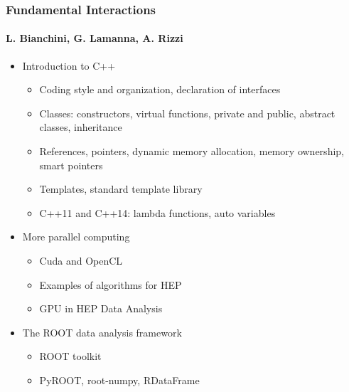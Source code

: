 \documentclass[9pt]{beamer}
\begin{document}
\begin{frame}
  \frametitle{Fundamental Interactions}
  \framesubtitle{L. Bianchini, G. Lamanna, A. Rizzi}
  \begin{itemize}
  \item Introduction to C++
    \begin{itemize}
    \item Coding style and organization, declaration of interfaces
    \item Classes: constructors, virtual functions, private and public,
      abstract classes, inheritance
    \item References, pointers, dynamic memory allocation, memory ownership,
      smart pointers
    \item Templates, standard template library
    \item C++11 and C++14: lambda functions, auto variables
    \end{itemize}
  \item More parallel computing
    \begin{itemize}
    \item Cuda and OpenCL
    \item Examples of algorithms for HEP
    \item GPU in HEP Data Analysis
    \end{itemize}
  \item The ROOT data analysis framework
    \begin{itemize}
    \item ROOT toolkit
    \item PyROOT, root-numpy, RDataFrame
    \end{itemize}
  \end{itemize}
\end{frame}
\end{document}
